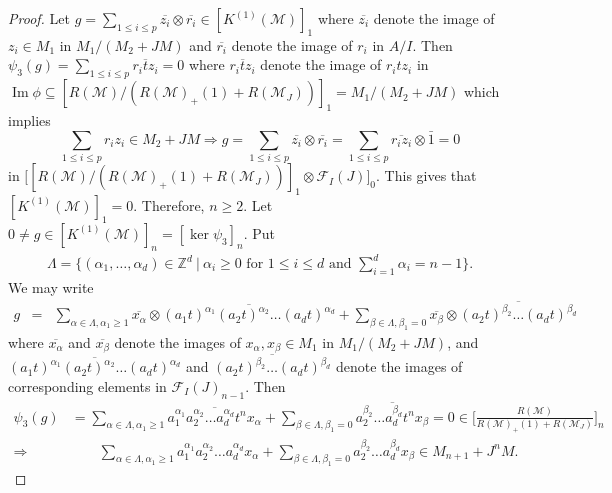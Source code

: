 \documentclass[11pt,reqno]{amsart}
\theoremstyle{definition}
\def\F{{\mathcal F}}
\def\M{{\mathcal M}}
\DeclareMathOperator{\im}{Im}
\numberwithin{equation}{section}
\begin{document}
\begin{proof}
	Let $g=\mathop\sum\limits_{1\leq i\leq p} \overline{z_i}\otimes\overline{r_i} \in [K^{(1)}(\M)]_1$ where $\overline{z_i}$ denote the image of 
	$z_i\in M_1$ in $M_1/(M_2+JM)$ and $\overline{r_i}$ denote the image of $r_i$ in $A/I$.  
	Then $\psi_3(g)=\mathop\sum\limits_{1\leq i\leq p} \overline{r_itz_i}=0$
	where $\overline{r_itz_i}$ denote the image of $r_itz_i$ in $\im \phi \subseteq [R(\M)/(R(\M)_+(1)+R(\M_J))]_1=M_1/(M_2+JM)$ which implies $$\mathop\sum\limits_{1\leq i\leq p} r_iz_i\in M_2+JM \Rightarrow
	g=\mathop\sum\limits_{1\leq i\leq p} \overline{z_i}\otimes \overline{r_i}=\mathop\sum\limits_{1\leq i\leq p}\overline{r_iz_i}\otimes \bar{1}=0$$
    in $\big[[R(\M)/(R(\M)_+(1)+R(\M_J))]_1\otimes \F_I(J)\big]_{0}$. 
	This gives that $[K^{(1)}(\M)]_1=0$. 
	Therefore, $n\geq 2.$ Let $0\neq g\in [K^{(1)}(\M)]_n=[\ker \psi_3]_n.$ Put 
	\begin{align*}
		\Lambda=\{(\alpha_1,\ldots,\alpha_d)\in \mathbb{Z}^d~|~  \alpha_i\geq 0 \text{ for } 1\leq i\leq d \text{ and } \mathop\sum_{i=1}^d \alpha_i=n-1\}.
	\end{align*}
	We may write 
	\begin{eqnarray*}
		g&=&\mathop\sum\limits_{\alpha \in\Lambda, \alpha_1\geq 1} \overline{x_\alpha}\otimes \overline{(a_1t)^{\alpha_1}(a_2t)^{\alpha_2}\ldots(a_dt)^{\alpha_d}}
		+ \mathop\sum\limits_{\beta\in\Lambda,\beta_1=0} \overline{x_\beta}\otimes \overline{(a_2t)^{\beta_2}\ldots(a_dt)^{\beta_d}}
	\end{eqnarray*}
	where $\overline{x_{\alpha}}$ and $\overline{x_{\beta}}$ denote the images of $x_{\alpha},x_{\beta}\in M_1$ in $M_1/(M_2+JM)$, and
	$\overline{(a_1t)^{\alpha_1}(a_2t)^{\alpha_2}\ldots(a_dt)^{\alpha_d}}$ and $\overline{(a_2t)^{\beta_2}\ldots(a_dt)^{\beta_d}}$
	denote the images of corresponding elements in $\F_I(J)_{n-1}$. Then
	\begin{align*}
		\psi_3(g)&=\mathop\sum\limits_{\alpha \in\Lambda, \alpha_1\geq 1} \overline{a_1^{\alpha_1}a_2^{\alpha_2}\ldots a_d^{\alpha_d}t^nx_{\alpha}}+\mathop\sum\limits_{\beta\in\Lambda,\beta_1=0}\overline{ a_2^{\beta_2}\ldots a_d^{\beta_d}t^nx_\beta}=0\in \Big[\frac{R(\M)}{R(\M)_+(1)+R(\M_J)}\Big]_n\\
		\Rightarrow &\qquad\mathop\sum\limits_{\alpha \in\Lambda, \alpha_1\geq 1} a_1^{\alpha_1}a_2^{\alpha_2}\ldots a_d^{\alpha_d}x_{\alpha}+
		\mathop\sum\limits_{\beta\in\Lambda,\beta_1=0} a_2^{\beta_2}\ldots a_d^{\beta_d}x_\beta \in M_{n+1}+J^nM.
	\end{align*}
	

\end{proof}
\end{document}
